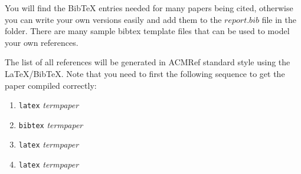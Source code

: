 \documentclass{sig-alternate}
\begin{document}
You will find the BibTeX entries needed for many papers being cited,
otherwise you can write your own versions easily and add them to the
$report.bib$ file in the folder. There are many sample bibtex
template files that can be used to model your own references.

The list of all references will be generated in ACMRef
standard style using the \LaTeX{}/BibTeX. Note that you
need to first the following sequence to get the paper
compiled correctly:

\begin{enumerate}
\item {\tt latex} {\em termpaper}
\item {\tt bibtex} {\em termpaper}
\item {\tt latex} {\em termpaper}
\item {\tt latex} {\em termpaper}
\end{enumerate}



\balance
\end{document}
